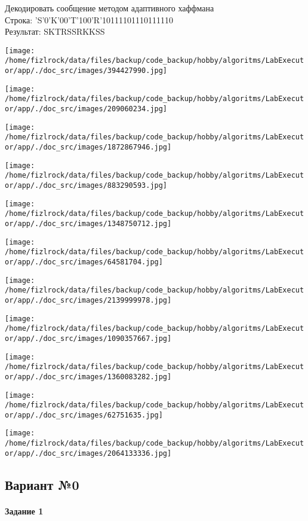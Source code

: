 \documentclass[a4paper, 12pt]{article}
\begin{document}
Декодировать сообщение методом адаптивного хаффмана \\
Строка: 
'S'0'K'00'T'100'R'10111101110111110\\
Результат: SKTRSSRKKSS

\texttt{[image: /home/fizlrock/data/files/backup/code\_backup/hobby/algoritms/LabExecutor/app/./doc\_src/images/394427990.jpg]}

\texttt{[image: /home/fizlrock/data/files/backup/code\_backup/hobby/algoritms/LabExecutor/app/./doc\_src/images/209060234.jpg]}

\texttt{[image: /home/fizlrock/data/files/backup/code\_backup/hobby/algoritms/LabExecutor/app/./doc\_src/images/1872867946.jpg]}

\texttt{[image: /home/fizlrock/data/files/backup/code\_backup/hobby/algoritms/LabExecutor/app/./doc\_src/images/883290593.jpg]}

\texttt{[image: /home/fizlrock/data/files/backup/code\_backup/hobby/algoritms/LabExecutor/app/./doc\_src/images/1348750712.jpg]}

\texttt{[image: /home/fizlrock/data/files/backup/code\_backup/hobby/algoritms/LabExecutor/app/./doc\_src/images/64581704.jpg]}

\texttt{[image: /home/fizlrock/data/files/backup/code\_backup/hobby/algoritms/LabExecutor/app/./doc\_src/images/2139999978.jpg]}

\texttt{[image: /home/fizlrock/data/files/backup/code\_backup/hobby/algoritms/LabExecutor/app/./doc\_src/images/1090357667.jpg]}

\texttt{[image: /home/fizlrock/data/files/backup/code\_backup/hobby/algoritms/LabExecutor/app/./doc\_src/images/1360083282.jpg]}

\texttt{[image: /home/fizlrock/data/files/backup/code\_backup/hobby/algoritms/LabExecutor/app/./doc\_src/images/62751635.jpg]}

\texttt{[image: /home/fizlrock/data/files/backup/code\_backup/hobby/algoritms/LabExecutor/app/./doc\_src/images/2064133336.jpg]}
\pagebreak
\subsection{Вариант №0}
\paragraph{Задание 1}
\end{document}
